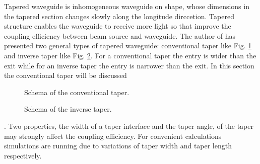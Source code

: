 Tapered waveguide is inhomogeneous waveguide on shape, whose dimensions in the tapered section changes slowly along the longitude dirccetion\cite{linear_tapered_waveguides}. Tapered structure enables the waveguide to receive more light so that improve the coupling efficiency between beam source and waveguide.  
The author of \cite{design_fabrication_tapered_waveguide} has presented two general types of tapered waveguide: conventional taper like Fig. \ref{fig:conventional_taper} and inverse taper like Fig. \ref{fig:inverse_taper}. For a conventional taper the entry is wider than the exit while for an inverse taper the entry is narrower than the exit. In this section the conventional taper will be discussed
\begin{figure}[!ht]
\centering
\caption{Schema of the conventional taper.}
\label{fig:conventional_taper}
\end{figure}
\begin{figure}[!ht]
\centering
\caption{Schema of the inverse taper.}
\label{fig:inverse_taper}
\end{figure}

.
Two properties, the width of a taper interface and the taper angle, of the taper may strongly affect the coupling efficiency. For convenient calculations simulations are running due to variations of taper width and taper length respectively.
